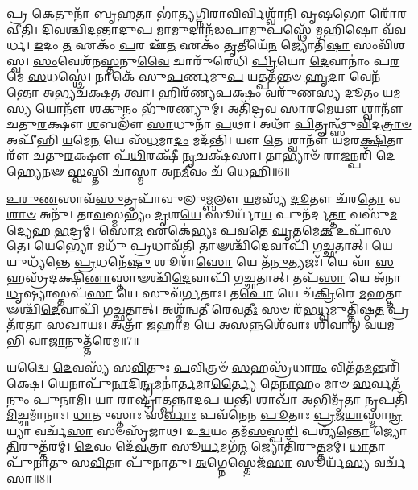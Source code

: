 𑌪𑍍𑌰 \ul{𑌕𑍇}\-𑌤𑍁𑌨𑌾᳴ 𑌬𑍃\-\ul{𑌹}\-𑌤𑌾 𑌭𑌾॑\-\ul{𑌤𑍍𑌯}\-𑌗𑍍𑌨𑌿\-\ul{𑌰𑌾}\-𑌵𑌿𑌰𑍍𑌵𑌿𑌶𑍍𑌵𑌾᳴𑌨𑌿 𑌵𑍃\-\ul{𑌷}\-𑌭𑍋 𑌰𑍋᳴𑌰𑌵𑍀𑌤𑌿। 
\-\ul{𑌦𑌿}\-𑌵\-\ul{𑌶𑍍𑌚𑌿}\-𑌦\-\ul{𑌨𑍍𑌤𑌾}\-𑌦𑍁\-\ul{𑌪} 𑌮𑌾\-\ul{𑌮𑍁}\-𑌦𑌾𑌨᳴\-\ul{𑌡}\-𑌪𑌾\-\ul{𑌮𑍁}\-𑌪𑌸𑍍𑌥𑍇᳴ 𑌮\-\ul{𑌹𑌿}\-𑌷𑍋 𑌵᳴𑌵𑌰𑍍𑌧। 
\-\ul{𑌇}\-𑌦𑌂 \ul{𑌤} 𑌏𑌕𑌂᳴ \ul{𑌪}\-𑌰 𑌊᳴\-\ul{𑌤} 𑌏𑌕𑌂᳴ \ul{𑌤𑍃}\-𑌤𑍀𑌯𑍇᳴\-\ul{𑌨} 𑌜𑍍𑌯𑍋𑌤𑌿᳴\-\ul{𑌷𑌾} 𑌸𑌂𑌵𑌿᳴𑌶𑌸𑍍𑌵। 
\-\ul{𑌸𑌂}\-𑌵𑍇𑌶᳴𑌨\-\ul{𑌸𑍍𑌤}\-𑌨𑍁\-\ul{𑌵𑍈} 𑌚𑌾𑌰𑍁᳴𑌰𑍇𑌧𑌿 \ul{𑌪𑍍𑌰𑌿}\-𑌯𑍋 \ul{𑌦𑍇}\-𑌵𑌾𑌨𑌾𑌂॑ 𑌪\-\ul{𑌰}\-𑌮𑍇 \ul{𑌸}\-𑌧𑌸𑍍𑌥𑍇॑। 
𑌨𑌾𑌕𑍇᳴ 𑌸𑍁\-\ul{𑌪}\-𑌰𑍍𑌣𑌮𑍁\-\ul{𑌪} 𑌯𑌤𑍍𑌪𑌤᳴𑌨𑍍𑌤𑍞 \ul{𑌹𑍃}\-𑌦𑌾 𑌵𑍇𑌨᳴𑌨𑍍𑌤𑍋 \ul{𑌅}\-𑌭𑍍𑌯𑌚᳴𑌕𑍍𑌷𑌤 𑌤𑍍𑌵𑌾। 
𑌹𑌿𑌰᳴𑌣𑍍𑌯𑌪\-\ul{𑌕𑍍𑌷𑌂} 𑌵𑌰𑍁᳴𑌣𑌸𑍍𑌯 \ul{𑌦𑍂}\-𑌤𑌂 \ul{𑌯}\-𑌮\-\ul{𑌸𑍍𑌯} 𑌯𑍋𑌨𑍗᳴ 𑌶\-\ul{𑌕𑍁}\-𑌨𑌂 𑌭𑍁᳴\-\ul{𑌰}\-𑌣𑍍𑌯𑍁𑌮𑍍। 
𑌅𑌤𑌿᳴𑌦𑍍𑌰𑌵 𑌸𑌾𑌰\-\ul{𑌮𑍇}\-𑌯𑍗 𑌶𑍍𑌵𑌾𑌨𑍗᳴ 𑌚𑌤𑍁\-\ul{𑌰}\-𑌕𑍍𑌷𑍗 \ul{𑌶}\-𑌬𑌲𑍗᳴ \ul{𑌸𑌾}\-𑌧𑍁𑌨𑌾᳴ \ul{𑌪}\-𑌥𑌾। 
𑌅𑌥𑌾᳴ \ul{𑌪𑌿}\-𑌤𑍄𑌨𑍍𑌥𑍍𑌸𑍁᳴\-\ul{𑌵𑌿}\-𑌦\-\ul{𑌤𑍍𑌰𑌾}\-\-\ul{𑍞} 𑌅𑌪𑍀᳴𑌹𑌿 \ul{𑌯}\-𑌮𑍇\-\ul{𑌨} 𑌯𑍇 𑌸᳴\-\ul{𑌧}\-𑌮𑌾\-\ul{𑌦𑌂} 𑌮𑌦᳴𑌨𑍍𑌤𑌿। 
𑌯𑍗 \ul{𑌤𑍇} 𑌶𑍍𑌵𑌾𑌨𑍗᳴ 𑌯𑌮𑌰\-\ul{𑌕𑍍𑌷𑌿}\-𑌤𑌾𑌰𑍗᳴ 𑌚𑌤𑍁\-\ul{𑌰}\-𑌕𑍍𑌷𑍗 𑌪᳴\-\ul{𑌥𑌿}\-𑌰𑌕𑍍𑌷𑍀᳴ \ul{𑌨𑍃}\-𑌚𑌕𑍍𑌷᳴𑌸𑌾। 
𑌤𑌾𑌭𑍍𑌯𑌾𑍞᳴ 𑌰𑌾\-\ul{𑌜}\-𑌨𑍍𑌪𑌰𑌿᳴ 𑌦𑍇𑌹𑍍𑌯𑍇𑌨𑍟 \ul{𑌸𑍍𑌵}\-𑌸𑍍𑌤𑌿 𑌚𑌾॑𑌸𑍍𑌮𑌾 𑌅𑌨\-\ul{𑌮𑍀}\-𑌵𑌂 𑌚᳴ 𑌧𑍇𑌹𑌿॥6॥

\-\ul{𑌉}\-\-\ul{𑌰𑍁}\-\-\ul{𑌣}\-𑌸𑌾𑌵᳴\-\ul{𑌸𑍁}\-𑌤𑍃𑌪𑌾᳴𑌵𑍁𑌲𑍁\-\ul{𑌮𑍍𑌬}\-𑌲𑍗 \ul{𑌯}\-𑌮𑌸𑍍𑌯᳴ \ul{𑌦𑍂}\-𑌤𑍗 𑌚᳴𑌰\-\ul{𑌤𑍋} 𑌵\-\ul{𑌶𑌾}\-\-\ul{𑍞} 𑌅𑌨𑍁᳴। 
𑌤𑌾\-\ul{𑌵}\-𑌸𑍍𑌮𑌭𑍍𑌯𑌂᳴ \ul{𑌦𑍃}\-𑌶\-\ul{𑌯𑍇} 𑌸𑍂𑌰𑍍𑌯𑌾᳴\-\ul{𑌯} 𑌪𑍁𑌨᳴𑌰𑍍𑌦\-\ul{𑌤𑍍𑌤𑌾} 𑌵𑌸𑍁᳴\-\ul{𑌮}\-𑌦𑍍𑌯𑍇𑌹 \ul{𑌭}\-𑌦𑍍𑌰𑌮𑍍। 
𑌸𑍋\-\ul{𑌮} 𑌏𑌕𑍇॑𑌭𑍍𑌯𑌃 𑌪𑌵𑌤𑍇 \ul{𑌘𑍃}\-𑌤𑌮𑍇\-\ul{𑌕} 𑌉𑌪𑌾᳴𑌸𑌤𑍇। 
𑌯𑍇\-\ul{𑌭𑍍𑌯𑍋} 𑌮𑌧𑍁᳴ \ul{𑌪𑍍𑌰}\-𑌧𑌾𑌵᳴\-\ul{𑌤𑌿} 𑌤𑌾𑍟𑌶𑍍𑌚𑌿᳴\-\ul{𑌦𑍇}\-𑌵𑌾𑌪𑌿᳴ 𑌗𑌚𑍍𑌛𑌤𑌾𑌤𑍍। 
𑌯𑍇 𑌯𑍁𑌧𑍍𑌯᳴𑌨𑍍𑌤𑍇 \ul{𑌪𑍍𑌰}\-𑌧𑌨𑍇᳴\-\ul{𑌷𑍁} 𑌶𑍂𑌰𑌾᳴\-\ul{𑌸𑍋} 𑌯𑍇 𑌤᳴\-\ul{𑌨𑍁}\-𑌤𑍍𑌯𑌜𑌃᳴। 
𑌯𑍇 𑌵𑌾᳴ \ul{𑌸}\-𑌹𑌸𑍍𑌰᳴𑌦𑌕𑍍𑌷𑌿\-\ul{𑌣𑌾}\-𑌸𑍍𑌤𑌾𑍟𑌶𑍍𑌚𑌿᳴\-\ul{𑌦𑍇}\-𑌵𑌾𑌪𑌿᳴ 𑌗𑌚𑍍𑌛𑌤𑌾𑌤𑍍। 
𑌤𑌪᳴\-\ul{𑌸𑌾} 𑌯𑍇 𑌅᳴𑌨𑌾\-\ul{𑌧𑍃}\-𑌷𑍍𑌯𑌾𑌸𑍍𑌤𑌪᳴\-\ul{𑌸𑌾} 𑌯𑍇 𑌸𑍁𑌵᳴\-\ul{𑌰𑍍𑌗}\-𑌤𑌾𑌃। 
𑌤\-\ul{𑌪𑍋} 𑌯𑍇 𑌚᳴\-\ul{𑌕𑍍𑌰𑌿}\-𑌰𑍇 \ul{𑌮}\-𑌹𑌤𑍍𑌤𑌾𑍟𑌶𑍍𑌚𑌿᳴\-\ul{𑌦𑍇}\-𑌵𑌾𑌪𑌿᳴ 𑌗𑌚𑍍𑌛𑌤𑌾𑌤𑍍। 
𑌅𑌶𑍍𑌮᳴𑌨𑍍𑌵𑌤𑍀 𑌰𑍇𑌵\-\ul{𑌤𑍀𑌃} 𑌸𑍞 𑌰᳴𑌭\-\ul{𑌧𑍍𑌵}\-𑌮𑍁𑌤𑍍𑌤𑌿᳴𑌷𑍍𑌠\-\ul{𑌤} 𑌪𑍍𑌰𑌤᳴𑌰𑌤𑌾 𑌸𑌖𑌾𑌯𑌃। 
𑌅𑌤𑍍𑌰𑌾᳴ 𑌜𑌹𑌾\-\ul{𑌮} 𑌯𑍇 𑌅\-\ul{𑌸}\-𑌨𑍍𑌨𑌶𑍇᳴𑌵𑌾𑌃  \ul{𑌶𑌿}\-𑌵𑌾𑌨𑍍 \ul{𑌵}\-𑌯\-\ul{𑌮}\-𑌭𑌿 𑌵𑌾\-\ul{𑌜𑌾}\-𑌨𑍁𑌤𑍍𑌤᳴𑌰𑍇𑌮॥7॥

𑌯𑌦𑍍𑌵𑍈 \ul{𑌦𑍇}\-𑌵𑌸𑍍𑌯᳴ 𑌸\-\ul{𑌵𑌿}\-𑌤𑍁𑌃 \ul{𑌪}\-𑌵𑌿𑌤𑍍𑌰𑍞᳴ \ul{𑌸}\-𑌹𑌸𑍍𑌰᳴𑌧𑌾\-\ul{𑌰𑌂}  𑌵𑌿𑌤᳴𑌤\-\ul{𑌮}\-𑌨𑍍𑌤𑌰𑌿᳴𑌕𑍍𑌷𑍇। 
𑌯𑍇𑌨𑌾𑌪𑍁᳴\-\ul{𑌨𑌾}\-𑌦𑌿\-\ul{𑌨𑍍𑌦𑍍𑌰}\-𑌮𑌨𑌾॑\-\ul{𑌰𑍍𑌤}\-𑌮𑌾\-\ul{𑌰𑍍𑌤𑍍𑌯𑍈} 𑌤𑍇\-\ul{𑌨𑌾}\-𑌹𑌂 𑌮𑌾𑍞 \ul{𑌸}\-𑌰𑍍𑌵𑌤᳴𑌨𑍁𑌂 𑌪𑍁𑌨𑌾𑌮𑌿। 
𑌯𑌾 \ul{𑌰𑌾}\-𑌷𑍍𑌟𑍍𑌰𑌾\-\ul{𑌤𑍍𑌪}\-𑌨𑍍𑌨𑌾𑌦\-\ul{𑌪} 𑌯\-\ul{𑌨𑍍𑌤𑌿} 𑌶𑌾𑌖𑌾᳴ \ul{𑌅}\-𑌭𑌿𑌮𑍃᳴𑌤𑌾 \ul{𑌨𑍃}\-𑌪𑌤𑌿᳴\-\ul{𑌮𑌿}\-𑌚𑍍𑌛𑌮𑌾᳴𑌨𑌾𑌃। 
\-\ul{𑌧𑌾}\-𑌤𑍁𑌸𑍍𑌤𑌾𑌃 𑌸\-\ul{𑌰𑍍𑌵𑌾𑌃} 𑌪𑌵᳴𑌨𑍇𑌨 \ul{𑌪𑍂}\-𑌤𑌾𑌃 \ul{𑌪𑍍𑌰}\-𑌜\-\ul{𑌯𑌾}\-𑌸𑍍𑌮𑌾\-\ul{𑌨𑍍𑌰}\-𑌯𑍍𑌯𑌾 𑌵𑌰𑍍𑌚᳴\-\ul{𑌸𑌾} 𑌸𑍞𑌸𑍃᳴𑌜𑌾𑌥। 
𑌉\-\ul{𑌦𑍍𑌵}\-𑌯𑌂 𑌤𑌮᳴\-\ul{𑌸}\-𑌸𑍍𑌪\-\ul{𑌰𑌿} 𑌪𑌶𑍍𑌯᳴\-\ul{𑌨𑍍𑌤𑍋} 𑌜𑍍𑌯𑍋\-\ul{𑌤𑌿}\-𑌰𑍁𑌤𑍍𑌤᳴𑌰𑌮𑍍। 
\-\ul{𑌦𑍇}\-𑌵𑌂 𑌦𑍇᳴\-\ul{𑌵}\-𑌤𑍍𑌰𑌾 𑌸𑍂\-\ul{𑌰𑍍𑌯}\-𑌮𑌗᳴\-\ul{𑌨𑍍𑌮} 𑌜𑍍𑌯𑍋𑌤𑌿᳴𑌰𑍁\-\ul{𑌤𑍍𑌤}\-𑌮𑌮𑍍। 
\-\ul{𑌧𑌾}\-𑌤𑌾 𑌪𑍁᳴𑌨𑌾𑌤𑍁 𑌸\-\ul{𑌵𑌿}\-𑌤𑌾 𑌪𑍁᳴𑌨𑌾𑌤𑍁। 
\-\ul{𑌅}\-𑌗𑍍𑌨𑍇𑌸𑍍𑌤𑍇𑌜᳴\-\ul{𑌸𑌾} 𑌸𑍂𑌰𑍍𑌯᳴\-\ul{𑌸𑍍𑌯} 𑌵𑌰𑍍𑌚᳴𑌸𑌾॥8॥
\anuvakamend[\-\ul{𑌧𑍇}\-𑌹𑍍𑌯𑍁𑌤𑍍𑌤᳴𑌰𑍇\-\ul{𑌮𑌾}\-𑌷𑍍𑌟𑍗 𑌚᳴]

